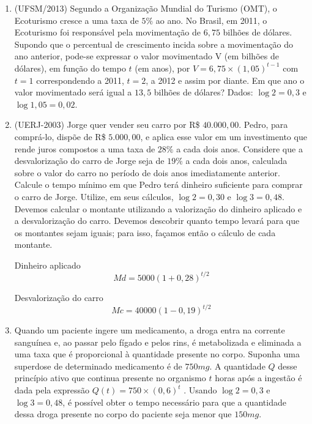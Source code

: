 \begin{enumerate}
\item {}\label{UFSM2013}

(UFSM/2013) Segundo a Organização Mundial do Turismo (OMT), o Ecoturismo cresce a uma taxa de $5\%$ ao ano. No Brasil, em 2011, o Ecoturismo foi responsável pela movimentação de $6{,}75$ bilhões de dólares. Supondo que o percentual de crescimento incida sobre a movimentação do ano anterior, pode-se expressar o valor movimentado V (em bilhões de dólares), em função do tempo $t$ (em anos), por $V = 6{,}75\times (1,05)^{t-1}$ com $t = 1$ correspondendo a 2011, $t = 2$, a 2012 e assim por diante. Em que ano o valor movimentado será igual a $13{,}5$ bilhões de dólares? Dados: $\log 2 = 0{,}3$ e $\log 1{,}05 = 0,02$.


\item{}\label{UERJ2003}

(UERJ-2003) Jorge quer vender seu carro por R\$ $40.000{,}00$. Pedro, para comprá-lo, dispõe de R\$ $5.000{,}00$, e aplica esse valor em um investimento que rende juros compostos a uma taxa de $28\%$ a cada dois anos. Considere que a desvalorização do carro de Jorge seja de $19\%$ a cada dois anos, calculada sobre o valor do carro no período de dois anos imediatamente anterior. Calcule o tempo mínimo em que Pedro terá dinheiro suficiente para comprar o carro de Jorge. Utilize, em seus cálculos, $\log 2 = 0{,}30$ e $\log 3 = 0{,}48$. Devemos calcular o montante utilizando a valorização do dinheiro aplicado e a desvalorização do carro. Devemos descobrir quanto tempo levará para que os montantes sejam iguais; para isso, façamos então o cálculo de cada montante.

Dinheiro aplicado
$$
Md=5000(1+0,28)^{t/2}
$$

Desvalorização do carro
$$
Mc=40000(1-0,19)^{t/2}
$$

\item{} \label{medicamento}

Quando um paciente ingere um medicamento, a droga entra na corrente sanguínea e, ao passar pelo fígado e pelos rins, é metabolizada e eliminada a uma taxa que é proporcional à quantidade presente no corpo. Suponha uma superdose de determinado medicamento é de $750 mg$. A quantidade $Q$ desse princípio ativo que continua presente no organismo $t$ horas após a ingestão é dada pela expressão $Q(t) = 750 \times (0,6)^t$ . Usando $\log 2 = 0{,}3$ e $\log 3 = 0{,}48$, é possível obter o tempo necessário para que a quantidade dessa droga presente no corpo do paciente seja menor que $150 mg$.


\end{enumerate}
